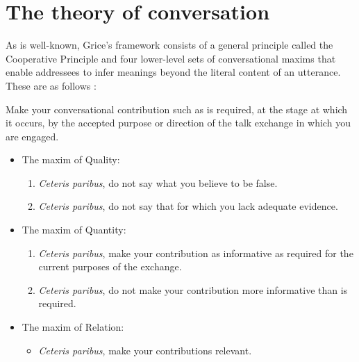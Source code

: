 \section{The theory of conversation} \label{sec:theory of conversation}

As is well-known, Grice's framework consists of a general principle called the Cooperative Principle and four lower-level sets of conversational maxims that enable addressees to infer meanings beyond the literal content of an utterance. These are as follows \citep[26--27]{grice:landc}:

\begin{description}[wide=0pt]
\item[The Cooperative Principle:] Make your conversational contribution such as is required, at the stage at which it occurs, by the accepted purpose or direction of the talk exchange in which you are engaged.
\begin{itemize}
 \item The maxim of Quality:
 \begin{enumerate}
  \item \emph{Ceteris paribus}, do not say what you believe to be false.
  \item \emph{Ceteris paribus}, do not say that for which you lack
  adequate evidence.
 \end{enumerate}
\end{itemize}

\begin{itemize}
 \item The maxim of Quantity:
 \begin{enumerate}
  \item \emph{Ceteris paribus},  make your contribution as
  informative as required for the current purposes of the exchange.
  \item \emph{Ceteris paribus}, do not make your contribution more
  informative than is required.
 \end{enumerate}
\end{itemize}

\begin{itemize}
 \item The maxim of Relation:
 \begin{itemize}
  \item \emph{Ceteris paribus}, make your contributions relevant.
 \end{itemize}
\end{itemize}


\end{description}
